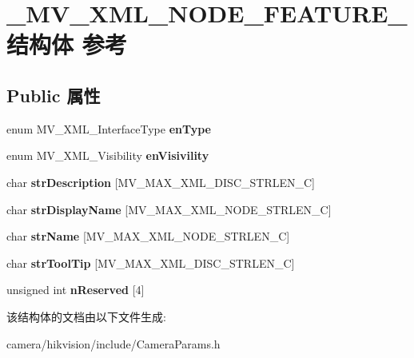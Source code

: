\hypertarget{struct___m_v___x_m_l___n_o_d_e___f_e_a_t_u_r_e__}{}\section{\+\_\+\+M\+V\+\_\+\+X\+M\+L\+\_\+\+N\+O\+D\+E\+\_\+\+F\+E\+A\+T\+U\+R\+E\+\_\+结构体 参考}
\label{struct___m_v___x_m_l___n_o_d_e___f_e_a_t_u_r_e__}
\subsection*{Public 属性}
\begin{DoxyCompactItemize}
\item 
\mbox{\label{struct___m_v___x_m_l___n_o_d_e___f_e_a_t_u_r_e___a6cf0a595a09ecf28f526c1a2ead4627d}} 
enum M\+V\+\_\+\+X\+M\+L\+\_\+\+Interface\+Type {\bfseries en\+Type}
\item 
\mbox{\label{struct___m_v___x_m_l___n_o_d_e___f_e_a_t_u_r_e___aeda7f96cc0323f505a946317780cc628}} 
enum M\+V\+\_\+\+X\+M\+L\+\_\+\+Visibility {\bfseries en\+Visivility}
\item 
\mbox{\label{struct___m_v___x_m_l___n_o_d_e___f_e_a_t_u_r_e___acf52c65e349d4075e502acfc0807e958}} 
char {\bfseries str\+Description} \mbox{[}M\+V\+\_\+\+M\+A\+X\+\_\+\+X\+M\+L\+\_\+\+D\+I\+S\+C\+\_\+\+S\+T\+R\+L\+E\+N\+\_\+C\mbox{]}
\item 
\mbox{\label{struct___m_v___x_m_l___n_o_d_e___f_e_a_t_u_r_e___a7cdc452fe7d38967ecf295c114990849}} 
char {\bfseries str\+Display\+Name} \mbox{[}M\+V\+\_\+\+M\+A\+X\+\_\+\+X\+M\+L\+\_\+\+N\+O\+D\+E\+\_\+\+S\+T\+R\+L\+E\+N\+\_\+C\mbox{]}
\item 
\mbox{\label{struct___m_v___x_m_l___n_o_d_e___f_e_a_t_u_r_e___af0ac4c0554221efe72c6f990ef7e07af}} 
char {\bfseries str\+Name} \mbox{[}M\+V\+\_\+\+M\+A\+X\+\_\+\+X\+M\+L\+\_\+\+N\+O\+D\+E\+\_\+\+S\+T\+R\+L\+E\+N\+\_\+C\mbox{]}
\item 
\mbox{\label{struct___m_v___x_m_l___n_o_d_e___f_e_a_t_u_r_e___aab0798e063639cfef86bb79580571440}} 
char {\bfseries str\+Tool\+Tip} \mbox{[}M\+V\+\_\+\+M\+A\+X\+\_\+\+X\+M\+L\+\_\+\+D\+I\+S\+C\+\_\+\+S\+T\+R\+L\+E\+N\+\_\+C\mbox{]}
\item 
\mbox{\label{struct___m_v___x_m_l___n_o_d_e___f_e_a_t_u_r_e___ae8ff1517622f5f655dfba8f545f2fe1e}} 
unsigned int {\bfseries n\+Reserved} \mbox{[}4\mbox{]}
\end{DoxyCompactItemize}


该结构体的文档由以下文件生成\+:\begin{DoxyCompactItemize}
\item 
camera/hikvision/include/Camera\+Params.\+h\end{DoxyCompactItemize}

